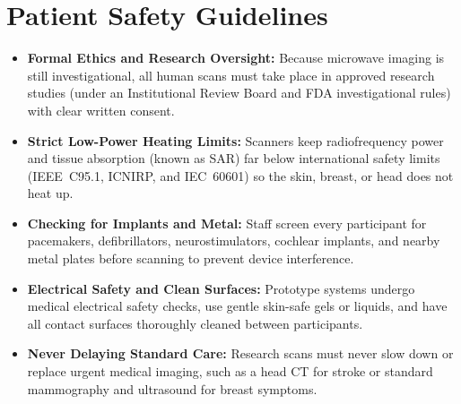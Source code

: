 \section{Patient Safety Guidelines}
\begin{itemize}
  \item \textbf{Formal Ethics and Research Oversight:} Because microwave imaging is still investigational, all human scans must take place in approved research studies (under an Institutional Review Board and FDA investigational rules) with clear written consent.
  \item \textbf{Strict Low-Power Heating Limits:} Scanners keep radiofrequency power and tissue absorption (known as SAR) far below international safety limits (IEEE~C95.1, ICNIRP, and IEC~60601) so the skin, breast, or head does not heat up.
  \item \textbf{Checking for Implants and Metal:} Staff screen every participant for pacemakers, defibrillators, neurostimulators, cochlear implants, and nearby metal plates before scanning to prevent device interference.
  \item \textbf{Electrical Safety and Clean Surfaces:} Prototype systems undergo medical electrical safety checks, use gentle skin-safe gels or liquids, and have all contact surfaces thoroughly cleaned between participants.
  \item \textbf{Never Delaying Standard Care:} Research scans must never slow down or replace urgent medical imaging, such as a head CT for stroke or standard mammography and ultrasound for breast symptoms.
\end{itemize}

